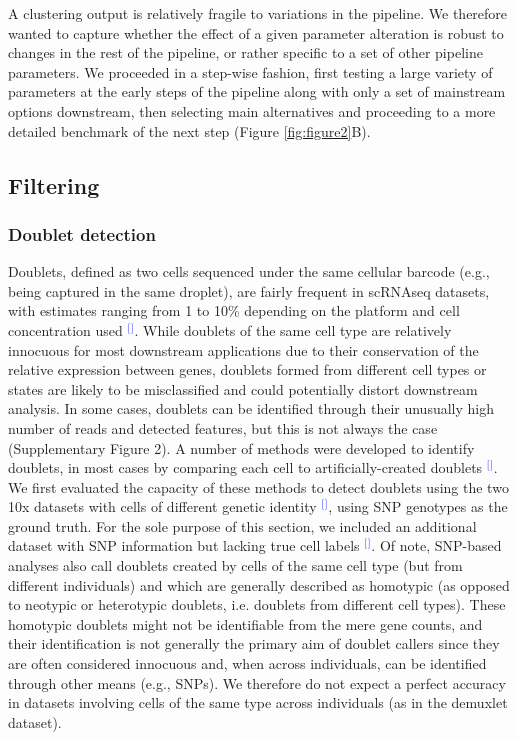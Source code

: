 \documentclass[11pt]{article}
\renewcommand{\cite}[1]{\textcolor{Blue}{$^[$\supercite{#1}$^]$}}
\begin{document}
A clustering output is relatively fragile to variations in the pipeline. We therefore wanted to capture whether the effect of a given parameter alteration is robust to changes in the rest of the pipeline, or rather specific to a set of other pipeline parameters. We proceeded in a step-wise fashion, first testing a large variety of parameters at the early steps of the pipeline along with only a set of mainstream options downstream, then selecting main alternatives and proceeding to a more detailed benchmark of the next step (Figure \ref{fig:figure2}B).



\subsection*{Filtering}

\subsubsection*{Doublet detection}

Doublets, defined as two cells sequenced under the same cellular barcode (e.g., being captured in the same droplet), are fairly frequent in scRNAseq datasets, with estimates ranging from 1 to 10\% depending on the platform and cell concentration used \cite{bloomEstimating2018,kangMultiplexedDemuxlet2018}. While doublets of the same cell type are relatively innocuous for most downstream applications due to their conservation of the relative expression between genes, doublets formed from different cell types or states are likely to be misclassified and could potentially distort downstream analysis. In some cases, doublets can be identified through their unusually high number of reads and detected features, but this is not always the case (Supplementary Figure 2). A number of methods were developed to identify doublets, in most cases by comparing each cell to artificially-created doublets \cite{mcginnisDoubletfinder2019, LunScran2016, BaisScds2019}. We first evaluated the capacity of these methods to detect doublets using the two 10x datasets with cells of different genetic identity \cite{tianMixology2018}, using SNP genotypes as the ground truth. For the sole purpose of this section, we included an additional dataset with SNP information but lacking true cell labels \cite{kangMultiplexedDemuxlet2018}. Of note, SNP-based analyses also call doublets created by cells of the same cell type (but from different individuals) and which are generally described as homotypic (as opposed to neotypic or heterotypic doublets, i.e. doublets from different cell types). These homotypic doublets might not be identifiable from the mere gene counts, and their identification is not generally the primary aim of doublet callers since they are often considered innocuous and, when across individuals, can be identified through other means (e.g., SNPs). We therefore do not expect a perfect accuracy in datasets involving cells of the same type across individuals (as in the demuxlet dataset).
\end{document}
